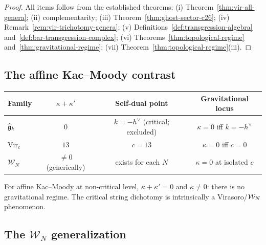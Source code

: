 \begin{proof}
All items follow from the established theorems:
(i) Theorem~\ref{thm:vir-all-genera};
(ii) complementarity;
(iii) Theorem~\ref{thm:ghost-sector-c26};
(iv) Remark~\ref{rem:vir-trichotomy-genera};
(v) Definitions~\ref{def:transgression-algebra}
and~\ref{def:bar-transgression-complex};
(vi) Theorems~\ref{thm:topological-regime}
and~\ref{thm:gravitational-regime};
(vii) Theorem~\ref{thm:topological-regime}(iii).
\end{proof}

%
%

\subsection{The affine Kac--Moody contrast}
\label{subsec:km-contrast}

\begin{remark}
\label{rem:g9-km-contrast}
\begin{center}
\renewcommand{\arraystretch}{1.3}
\begin{tabular}{lccc}
\toprule
Family & $\kappa + \kappa'$ & Self-dual point &
Gravitational locus \\
\midrule
$\widehat{\mathfrak{g}}_k$ &
$0$ & $k = -h^\vee$ (critical; excluded) &
$\kappa = 0$ iff $k = -h^\vee$ \\
$\mathrm{Vir}_c$ &
$13$ & $c = 13$ &
$\kappa = 0$ iff $c = 0$ \\
$\mathcal{W}_N$ &
$\ne 0$ (generically) & exists for each $N$ &
$\kappa = 0$ at isolated $c$ \\
\bottomrule
\end{tabular}
\end{center}
For affine Kac--Moody at non-critical level, $\kappa + \kappa' = 0$
and $\kappa \neq 0$: there is no gravitational regime. The
critical string dichotomy is intrinsically a Virasoro/$\mathcal{W}_N$
phenomenon.
\end{remark}

\subsection{The $\mathcal{W}_N$ generalization}
\label{subsec:wn-dichotomy}


